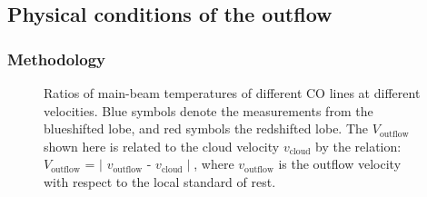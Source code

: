 \subsection{Physical conditions of the outflow}
\subsubsection{Methodology}

\begin{figure}[tbp]
\caption{Ratios of main-beam temperatures of different CO lines at different velocities. Blue symbols denote the measurements from the blueshifted lobe, and red symbols the redshifted lobe. The $V_{\mathrm{outflow}}$ shown here is related to the cloud velocity $v_{\mathrm{cloud}}$ by the relation: $V_{\mathrm{outflow}}$ = $\mid$ $v_{\mathrm{outflow}}$ - $v_{\mathrm{cloud}}\mid$, where $v_{\mathrm{outflow}}$ is the outflow velocity with respect to the local standard of rest. \label{fig:figratio}}
\end{figure}

